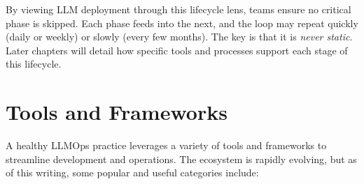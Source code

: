 \noindent By viewing LLM deployment through this lifecycle lens, teams ensure no critical phase is skipped. Each phase feeds into the next, and the loop may repeat quickly (daily or weekly) or slowly (every few months). The key is that it is \emph{never static}. Later chapters will detail how specific tools and processes support each stage of this lifecycle.


\section{Tools and Frameworks}
\label{sec:ch2-tools}
A healthy LLMOps practice leverages a variety of tools and frameworks to streamline development and operations. The ecosystem is rapidly evolving, but as of this writing, some popular and useful categories include:


